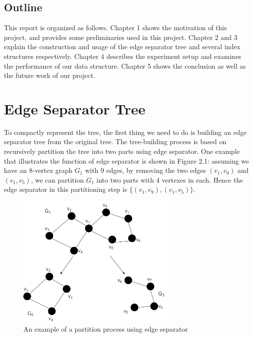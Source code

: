 \documentclass[12pt,glossary]{dalthesis}
\begin{document}
\section{Outline}
This report is organized as follows. Chapter 1 shows the motivation of this project, and provides some preliminaries used in this project. Chapter 2 and 3 explain the construction and usage of the edge separator tree and several index structures respectively. Chapter 4 describes the experiment setup and examines the performance of our data structure. Chapter 5 shows the conclusion as well as the future work of our project.

\chapter{Edge Separator Tree}

To compactly represent the tree, the first thing we need to do is building an edge separator tree from the original tree. The tree-building process is based on recursively partition the tree into two parts using edge separator. One example that illustrates the function of edge separator is shown in Figure 2.1: assuming we have an 8-vertex graph $G_{1}$ with 9 edges, by removing the two edges $(v_{1}, v_{9})$ and $(v_{1}, v_{5})$, we can partition $G_{1}$ into two parts with 4 vertexes in each. Hence the edge separator in this partitioning step is $\{(v_{1}, v_{9}),(v_{1}, v_{5}) \}$.

\bigskip

\begin{figure}[ht]
\centering
\includegraphics[width=0.7\textwidth]{partition}
\caption{An example of a partition process using edge separator}
\end{figure}

\bigskip
\end{document}
